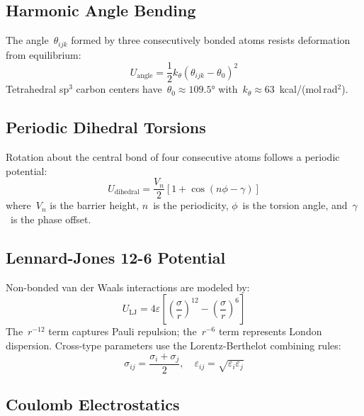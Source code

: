 \documentclass[conference]{IEEEtran}
\begin{document}
\subsection{Harmonic Angle Bending}

The angle~$\theta_{ijk}$ formed by three consecutively bonded atoms resists
deformation from equilibrium:
\begin{equation}\label{eq:angle}
U_{\text{angle}} = \frac{1}{2} k_\theta (\theta_{ijk} - \theta_0)^2
\end{equation}
Tetrahedral sp$^3$ carbon centers have~$\theta_0 \approx 109.5°$ with~$k_\theta
\approx 63$~kcal/(mol\,rad$^2$).

\subsection{Periodic Dihedral Torsions}

Rotation about the central bond of four consecutive atoms follows a periodic
potential:
\begin{equation}\label{eq:dihedral}
U_{\text{dihedral}} = \frac{V_n}{2} \left[ 1 + \cos(n\phi - \gamma) \right]
\end{equation}
where~$V_n$ is the barrier height, $n$~is the periodicity, $\phi$~is the
torsion angle, and~$\gamma$~is the phase offset.

\subsection{Lennard-Jones 12-6 Potential}

Non-bonded van der Waals interactions are modeled by:
\begin{equation}\label{eq:lj}
U_{\text{LJ}} = 4\varepsilon \left[ \left(\frac{\sigma}{r}\right)^{12}
    - \left(\frac{\sigma}{r}\right)^{6} \right]
\end{equation}
The~$r^{-12}$ term captures Pauli repulsion; the~$r^{-6}$ term represents
London dispersion.  Cross-type parameters use the Lorentz-Berthelot combining
rules:
\begin{equation}\label{eq:combine}
\sigma_{ij} = \frac{\sigma_i + \sigma_j}{2}, \quad
\varepsilon_{ij} = \sqrt{\varepsilon_i \varepsilon_j}
\end{equation}

\subsection{Coulomb Electrostatics}
\end{document}
